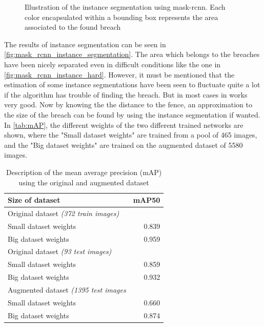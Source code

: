 \documentclass[../Head/Main.tex]{subfiles}
\begin{document}
\begin{figure}[H]
\begin{subfigure}{.23\textwidth}
        \caption{}
    \end{subfigure}
    \vspace{-5pt}
    \caption{Illustration of the instance segmentation using mask-rcnn. Each color encapsulated within a bounding box represents the area associated to the found breach}
     \label{fig:mask_rcnn_instance_segmentation}
\end{figure}
The results of instance segmentation can be seen in \autoref{fig:mask_rcnn_instance_segmentation}. The area which belongs to the breaches have been nicely separated even in difficult conditions like the one in \autoref{fig:mask_rcnn_instance_hard}. However, it must be mentioned that the estimation of some instance segmentations have been seen to fluctuate quite a lot if the algorithm has trouble of finding the breach. But in most cases in works very good. Now by knowing the the distance to the fence, an approximation to the size of the breach can be found by using the instance segmentation if wanted. In \autoref{tab:mAP}, the different weights of the two different trained networks are shown, where the "Small dataset weights" are trained from a pool of 465 images, and the "Big dataset weights" are trained on the augmented dataset of 5580 images.

\begin{table}[H]
\centering
\caption{Description of the mean average precision (mAP) using the original and augmented dataset}
\label{tab:mAP}
\begin{tabular}{lr}
\toprule
Size of dataset & mAP50\\
\midrule

Original dataset \textit{(372 train images)} &\\
\phantom{ZZ} Small dataset weights & 0.839\\
\phantom{ZZ} Big dataset weights & 0.959\\

Original dataset \textit{(93 test images)} &\\
\phantom{ZZ} Small dataset weights & 0.859\\
\phantom{ZZ} Big dataset weights & 0.932\\

Augmented dataset \textit{(1395 test images}&\\
\phantom{ZZ} Small dataset weights & 0.660\\
\phantom{ZZ} Big dataset weights & 0.874\\

\bottomrule                
\end{tabular}
\end{table}
\end{document}
